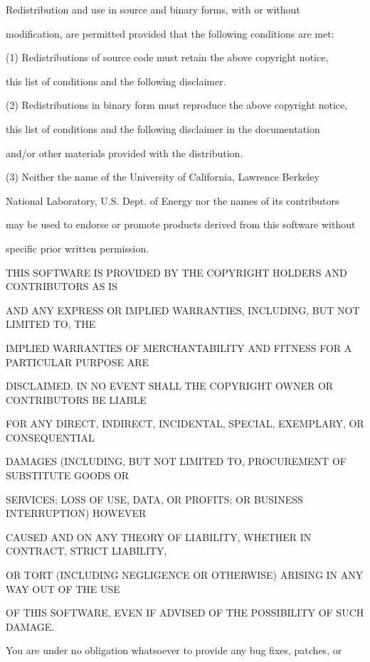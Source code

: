 \documentclass[letterpaper,10pt,english]{sphinxmanual}
\begin{document}
\begin{sphinxVerbatim}[commandchars=\\\{\}]
Redistribution and use in source and binary forms, with or without

modification, are permitted provided that the following conditions are met:


(1) Redistributions of source code must retain the above copyright notice,

this list of conditions and the following disclaimer.


(2) Redistributions in binary form must reproduce the above copyright notice,

this list of conditions and the following disclaimer in the documentation

and/or other materials provided with the distribution.


(3) Neither the name of the University of California, Lawrence Berkeley

National Laboratory, U.S. Dept. of Energy nor the names of its contributors

may be used to endorse or promote products derived from this software without

specific prior written permission.


THIS SOFTWARE IS PROVIDED BY THE COPYRIGHT HOLDERS AND CONTRIBUTORS \PYGZdq{}AS IS\PYGZdq{}

AND ANY EXPRESS OR IMPLIED WARRANTIES, INCLUDING, BUT NOT LIMITED TO, THE

IMPLIED WARRANTIES OF MERCHANTABILITY AND FITNESS FOR A PARTICULAR PURPOSE ARE

DISCLAIMED. IN NO EVENT SHALL THE COPYRIGHT OWNER OR CONTRIBUTORS BE LIABLE

FOR ANY DIRECT, INDIRECT, INCIDENTAL, SPECIAL, EXEMPLARY, OR CONSEQUENTIAL

DAMAGES (INCLUDING, BUT NOT LIMITED TO, PROCUREMENT OF SUBSTITUTE GOODS OR

SERVICES; LOSS OF USE, DATA, OR PROFITS; OR BUSINESS INTERRUPTION) HOWEVER

CAUSED AND ON ANY THEORY OF LIABILITY, WHETHER IN CONTRACT, STRICT LIABILITY,

OR TORT (INCLUDING NEGLIGENCE OR OTHERWISE) ARISING IN ANY WAY OUT OF THE USE

OF THIS SOFTWARE, EVEN IF ADVISED OF THE POSSIBILITY OF SUCH DAMAGE.


You are under no obligation whatsoever to provide any bug fixes, patches, or


\end{sphinxVerbatim}
\end{document}
